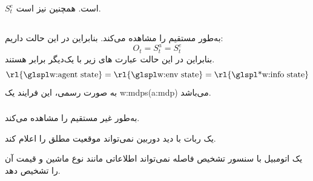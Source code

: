 \begin{remark}
	 $S_t^e$   است.
	همچنین 
	 نیز  است.
\end{remark}


\subsection{}

\subsubsection{}

به‌طور مستقیم  را مشاهده می‌کند. بنابراین در این حالت داریم:
	\[
		O_t = S_t^a = S_t^e
	\]
بنابراین در این حالت عبارت های زیر با یک‌دیگر برابر هستند.
	\[
	\text{\rl{\w{agent state}}} = \text{\rl{\w{env state}}} = \text{\rl{\ws{info state}}}
	\]
به صورت رسمی، این فرایند یک \Glspl{w:mdp}(\gls*{a:mdp}) می‌باشد.
\cite{Sutton1998}
	

\subsubsection{}
 به‌طور غیر مستقیم  را مشاهده می‌کند.
\begin{example}
			یک ربات با دید دوربین نمی‌تواند موقعیت مطلق را اعلام کند.		
\end{example}
\begin{example}
	یک اتومبیل با سنسور تشخیص فاصله نمی‌تواند اطلاعاتی مانند نوع ماشین و قیمت آن را تشخیص دهد.
\end{example}















